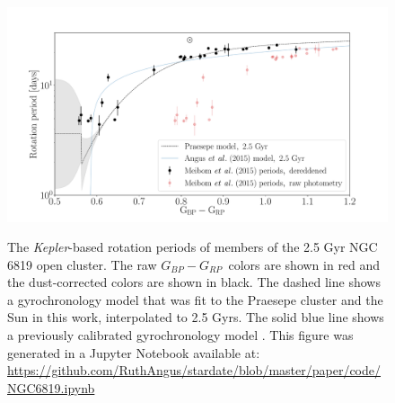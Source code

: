 \documentclass[useAMS, usenatbib, preprint, 12pt]{aastex}
\newcommand{\kepler}{{\it Kepler}}
\newcommand{\gcolor}{$G_{BP} - G_{RP}$}
\begin{document}
\begin{figure}
  \caption{
    The \kepler-based rotation periods of members of the 2.5 Gyr NGC 6819 open
    cluster.
    The raw \gcolor\ colors are shown in red and the dust-corrected colors are
    shown in black.
    The dashed line shows a gyrochronology model that was fit to the Praesepe
    cluster and the Sun in this work, interpolated to 2.5 Gyrs.
    The solid blue line shows a previously calibrated gyrochronology model
    \citep{angus2015}.
    This figure was generated in a Jupyter Notebook available at:
    \url{https://github.com/RuthAngus/stardate/blob/master/paper/code/NGC6819.ipynb}
  }
  \centering
    \includegraphics[width=1\textwidth]{NGC6819}
\label{fig:NGC6819}
\end{figure}
\end{document}
